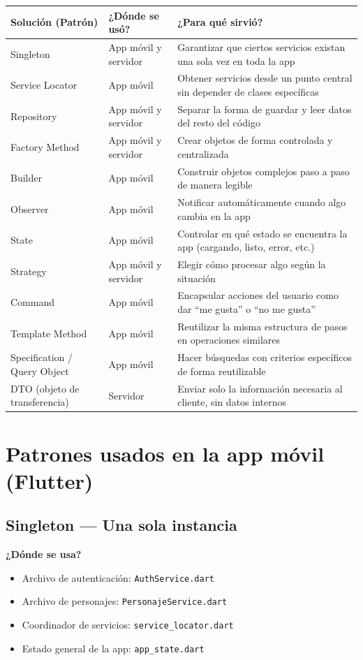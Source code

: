 \documentclass[12pt,a4paper]{article}
\begin{document}
\begin{longtable}{|>{\raggedright\arraybackslash}p{4.5cm}|>{\raggedright\arraybackslash}p{3cm}|>{\raggedright\arraybackslash}p{6cm}|}
\hline
\textbf{Solución (Patrón)} & \textbf{¿Dónde se usó?} & \textbf{¿Para qué sirvió?} \\
\hline
Singleton & App móvil y servidor & Garantizar que ciertos servicios existan una sola vez en toda la app \\
\hline
Service Locator & App móvil & Obtener servicios desde un punto central sin depender de clases específicas \\
\hline
Repository & App móvil y servidor & Separar la forma de guardar y leer datos del resto del código \\
\hline
Factory Method & App móvil y servidor & Crear objetos de forma controlada y centralizada \\
\hline
Builder & App móvil & Construir objetos complejos paso a paso de manera legible \\
\hline
Observer & App móvil & Notificar automáticamente cuando algo cambia en la app \\
\hline
State & App móvil & Controlar en qué estado se encuentra la app (cargando, listo, error, etc.) \\
\hline
Strategy & App móvil y servidor & Elegir cómo procesar algo según la situación \\
\hline
Command & App móvil & Encapsular acciones del usuario como dar ``me gusta'' o ``no me gusta'' \\
\hline
Template Method & App móvil & Reutilizar la misma estructura de pasos en operaciones similares \\
\hline
Specification / Query Object & App móvil & Hacer búsquedas con criterios específicos de forma reutilizable \\
\hline
DTO (objeto de transferencia) & Servidor & Enviar solo la información necesaria al cliente, sin datos internos \\
\hline
\end{longtable}

\section{Patrones usados en la app móvil (Flutter)}

\subsection{Singleton — Una sola instancia}
\textbf{¿Dónde se usa?}
\begin{itemize}[leftmargin=1.2cm]
  \item Archivo de autenticación: \texttt{AuthService.dart}
  \item Archivo de personajes: \texttt{PersonajeService.dart}
  \item Coordinador de servicios: \texttt{service\_locator.dart}
  \item Estado general de la app: \texttt{app\_state.dart}
\end{itemize}
\end{document}
